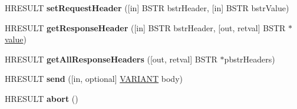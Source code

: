 \begin{DoxyCompactItemize}
\item 
\mbox{\label{interface_m_s_x_m_l2_1_1_i_x_m_l_h_t_t_p_request_a00cbfdde8955835d077bdd8dd2d85c89}} 
H\+R\+E\+S\+U\+LT {\bfseries set\+Request\+Header} (\mbox{[}in\mbox{]} B\+S\+TR bstr\+Header, \mbox{[}in\mbox{]} B\+S\+TR bstr\+Value)
\item 
\mbox{\label{interface_m_s_x_m_l2_1_1_i_x_m_l_h_t_t_p_request_af6a3a39333faafb5c348bef6da52388d}} 
H\+R\+E\+S\+U\+LT {\bfseries get\+Response\+Header} (\mbox{[}in\mbox{]} B\+S\+TR bstr\+Header, \mbox{[}out, retval\mbox{]} B\+S\+TR $\ast$\hyperlink{unionvalue}{value})
\item 
\mbox{\label{interface_m_s_x_m_l2_1_1_i_x_m_l_h_t_t_p_request_ac7ef7f39ab302a2a492acba0a66f2b5b}} 
H\+R\+E\+S\+U\+LT {\bfseries get\+All\+Response\+Headers} (\mbox{[}out, retval\mbox{]} B\+S\+TR $\ast$pbstr\+Headers)
\item 
\mbox{\label{interface_m_s_x_m_l2_1_1_i_x_m_l_h_t_t_p_request_a334a1cc5f473bcba29051f2984024d84}} 
H\+R\+E\+S\+U\+LT {\bfseries send} (\mbox{[}in, optional\mbox{]} \hyperlink{structtag_v_a_r_i_a_n_t}{V\+A\+R\+I\+A\+NT} body)
\item 
\mbox{\label{interface_m_s_x_m_l2_1_1_i_x_m_l_h_t_t_p_request_a70823553510730e7fba9e02bc352d387}} 
H\+R\+E\+S\+U\+LT {\bfseries abort} ()
\end{DoxyCompactItemize}
